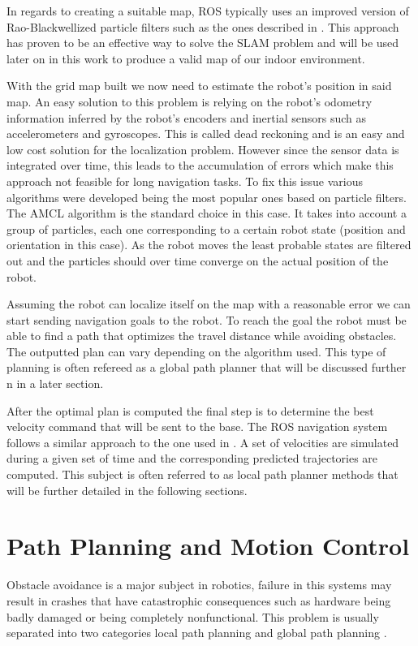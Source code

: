 In regards to creating a suitable map,  \ac{ROS}  typically uses an improved version of  Rao-Blackwellized particle filters such as the ones described in \cite{grisetti2007improved}. This approach has proven to be an effective way to solve the \ac{SLAM} problem and will be used later on in this work to produce a valid map of our indoor environment.

With the grid map built we now need to estimate the robot's position in said map. 
An easy solution to this problem is relying on the robot's odometry information inferred by the robot's encoders and inertial sensors such as accelerometers and gyroscopes. This is called dead reckoning and is an easy and low cost solution for the localization problem. However since the sensor data is integrated over time, this leads to the accumulation of errors which make this approach not feasible for long navigation tasks. 
To fix this issue various algorithms were developed being the most popular ones based on particle filters. The \ac{AMCL} \cite{amclpaper} algorithm  is the standard choice in this case. It takes into account a group of particles, each one corresponding to a certain robot state (position and orientation in this case). As the robot moves the least probable states are filtered out and  the particles should over time converge on the actual position of the robot.  

Assuming the robot can localize itself on the map with a reasonable error we can start sending navigation goals to the robot. To reach the goal the robot must be able to find a path that optimizes the travel distance while avoiding obstacles. The outputted plan can vary depending on the algorithm used. This type of planning is often refereed as a global path planner that will be discussed further n in a later section.

After the optimal plan is computed the final step is to determine the best velocity command that will be sent to the base.  The ROS navigation system follows a similar approach to the one used in \cite{gerkey2008planning}. A set of velocities are simulated during a given set of time and the corresponding predicted trajectories are  computed. This subject is often referred to as local path planner methods that will be further detailed in the following sections.


\section{Path Planning and Motion Control}
 Obstacle avoidance is a major subject in robotics, failure in this systems may result in crashes that have catastrophic consequences such as hardware being badly damaged or being completely nonfunctional. This problem is usually separated into two categories local path planning and global path planning \cite{foxdwa}.
 
